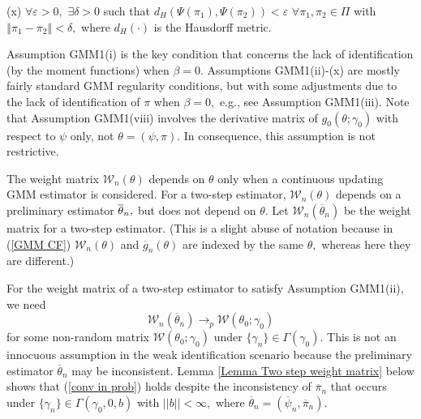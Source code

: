 \documentclass[12pt,titlepage,final,oneside,letterpaper]{article}
\begin{document}
\noindent (x) $\forall \varepsilon >0,$ $\exists \delta >0$ such that $%
d_{H}\left( \Psi \left( \pi _{1}\right) ,\Psi \left( \pi _{2}\right) \right)
<\varepsilon $ $\forall \pi _{1},\pi _{2}\in \Pi $ with $\left\Vert \pi
_{1}-\pi _{2}\right\Vert <\delta ,$ where $d_{H}\left( \cdot \right) $ is
the Hausdorff metric.\medskip

Assumption GMM1(i) is the key condition that concerns the lack of
identification (by the moment functions) when $\beta =0.$ Assumptions
GMM1(ii)-(x) are mostly fairly standard GMM regularity conditions, but with
some adjustments due to the lack of identification of $\pi $ when $\beta =0,$
e.g., see Assumption GMM1(iii). Note that Assumption GMM1(viii) involves the
derivative matrix of $g_{0}(\theta ;\gamma _{0})$ with respect to $\psi $
only, not $\theta =(\psi ,\pi ).$ In consequence, this assumption is not
restrictive.

The weight matrix $\mathcal{W}_{n}(\theta )$ depends on $\theta $ only when
a continuous updating GMM estimator is considered. For a two-step estimator, 
$\mathcal{W}_{n}(\theta )$ depends on a preliminary estimator $\overline{%
\theta }_{n},$ but does not depend on $\theta .$ Let $\mathcal{W}_{n}(%
\overline{\theta }_{n})$ be the weight matrix for a two-step estimator.
(This is a slight abuse of notation because in (\ref{GMM CF}) $\mathcal{W}%
_{n}(\theta )$ and $\overline{g}_{n}(\theta )$ are indexed by the same $%
\theta ,$ whereas here they are different.)

For the weight matrix of a two-step estimator to satisfy Assumption
GMM1(ii), we need 
\begin{equation}
\mathcal{W}_{n}(\overline{\theta }_{n})\rightarrow _{p}\mathcal{W}(\theta
_{0};\gamma _{0})  \label{conv in prob}
\end{equation}%
for some non-random matrix $\mathcal{W}(\theta _{0};\gamma _{0})$ under $%
\{\gamma _{n}\}\in \Gamma (\gamma _{0}).$ This is not an innocuous
assumption in the weak identification scenario because the preliminary
estimator $\overline{\theta }_{n}$ may be inconsistent. Lemma \ref{Lemma Two
step weight matrix} below shows that (\ref{conv in prob}) holds despite the
inconsistency of $\overline{\pi }_{n}$ that occurs under $\{\gamma _{n}\}\in
\Gamma (\gamma _{0},0,b)$ with $||b||<\infty ,$ where $\overline{\theta }%
_{n}=(\overline{\psi }_{n},\overline{\pi }_{n}).$
\end{document}
